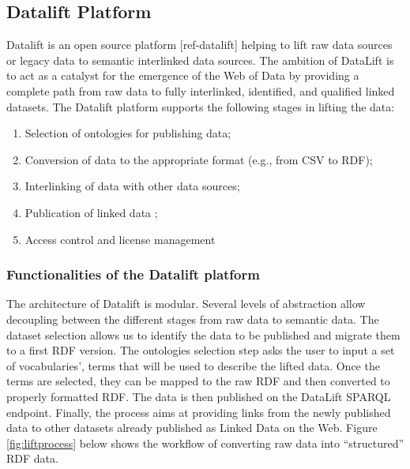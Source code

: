 \subsection{Datalift Platform}
\label{sec:datalift}
Datalift is an open source platform [ref-datalift] helping to lift raw data sources or legacy data to semantic interlinked data sources.
The ambition of DataLift is to act as a catalyst for the emergence of the Web of Data by providing a complete path from raw data to fully interlinked, identified, and qualified linked datasets. The Datalift platform supports the following stages in lifting the data:
\begin{enumerate}
\item Selection of ontologies for publishing data;
\item Conversion of data to the appropriate format (e.g., from CSV to RDF);
\item Interlinking of data with other data sources;
\item Publication of linked data ;
\item Access control and license management
\end{enumerate}



\subsubsection{Functionalities of the Datalift platform}

The architecture of Datalift is modular. Several levels of abstraction allow decoupling between the different stages from raw data to semantic data. The dataset selection allows us to identify the data to be published and migrate them to a first RDF version. The ontologies selection step asks the user to input a set of vocabularies', terms that will be used to describe the lifted data. Once the terms are selected, they can be mapped to the raw RDF and then converted to properly formatted RDF. The data is then published on the DataLift SPARQL endpoint. Finally, the process aims at providing links from the newly published data to other datasets already published as Linked Data on the Web. Figure \ref{fig:liftprocess} below shows the workflow of converting raw data into ``structured'' RDF data.


